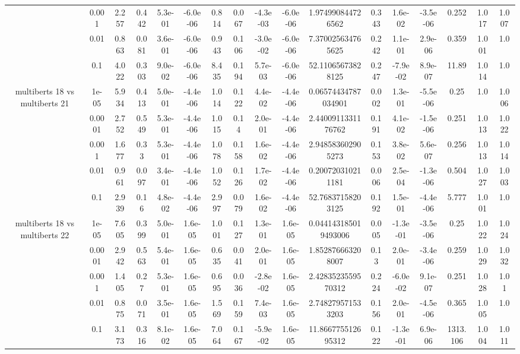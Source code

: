 \begin{tabular}{|c|c|c|c|c|c|c|c|c|c|c|c|c|c|c|c|c|}
 & 0.001 & 2.257 & 0.442 & 5.3e-01 & -6.0e-06 & 0.814 & 0.067 & -4.3e-03 & -6.0e-06 & 1.974990844726562 & 0.343 & 1.6e-02 & -3.5e-06 & 0.252 & 1.017 & 1.007 \\
 & 0.01 & 0.863 & 0.081 & 3.6e-01 & -6.0e-06 & 0.943 & 0.106 & -3.0e-02 & -6.0e-06 & 7.370025634765625 & 0.242 & 1.1e-01 & 2.9e-06 & 0.359 & 1.001 & 1.0 \\
 & 0.1 & 4.022 & 0.303 & 9.0e-02 & -6.0e-06 & 8.435 & 0.194 & 5.7e-03 & -6.0e-06 & 52.11065673828125 & 0.247 & -7.9e-02 & 8.9e-07 & 11.89 & 1.014 & 1.0 \\
\hline
\multirow{5}{*}{multiberts 18 vs multiberts 21} & 1e-05 & 5.934 & 0.413 & 5.0e-01 & -4.4e-06 & 1.014 & 0.122 & 4.4e-02 & -4.4e-06 & 0.06574434787034901 & 0.002 & 1.3e-01 & -5.5e-06 & 0.25 & 1.0 & 1.006 \\
 & 0.0001 & 2.752 & 0.549 & 5.3e-01 & -4.4e-06 & 1.015 & 0.14 & 2.0e-01 & -4.4e-06 & 2.4400911331176762 & 0.191 & 4.1e-02 & -1.5e-06 & 0.251 & 1.013 & 1.022 \\
 & 0.001 & 1.677 & 0.33 & 5.3e-01 & -4.4e-06 & 1.078 & 0.158 & 1.6e-02 & -4.4e-06 & 2.948583602905273 & 0.153 & 3.8e-02 & 5.6e-07 & 0.256 & 1.013 & 1.014 \\
 & 0.01 & 0.961 & 0.097 & 3.4e-01 & -4.4e-06 & 1.052 & 0.126 & 1.7e-02 & -4.4e-06 & 0.200720310211181 & 0.006 & 2.5e-04 & -1.3e-06 & 0.504 & 1.027 & 1.003 \\
 & 0.1 & 2.939 & 0.16 & 4.8e-02 & -4.4e-06 & 2.997 & 0.079 & 1.6e-02 & -4.4e-06 & 52.76837158203125 & 0.192 & 1.5e-01 & -4.4e-06 & 5.777 & 1.001 & 1.0 \\
\hline
\multirow{5}{*}{multiberts 18 vs multiberts 22} & 1e-05 & 7.605 & 0.399 & 5.0e-01 & 1.6e-05 & 1.001 & 0.127 & 1.3e-01 & 1.6e-05 & 0.044143185019493006 & 0.005 & -1.3e-01 & -3.5e-06 & 0.25 & 1.022 & 1.024 \\
 & 0.0001 & 2.942 & 0.563 & 5.4e-01 & 1.6e-05 & 0.635 & 0.041 & 2.0e-01 & 1.6e-05 & 1.852876663208007 & 0.13 & 2.0e-01 & -3.4e-06 & 0.259 & 1.029 & 1.032 \\
 & 0.001 & 1.405 & 0.27 & 5.3e-01 & 1.6e-05 & 0.695 & 0.036 & -2.8e-02 & 1.6e-05 & 2.4283523559570312 & 0.224 & -6.0e-02 & 9.1e-07 & 0.251 & 1.028 & 1.01 \\
 & 0.01 & 0.875 & 0.071 & 3.5e-01 & 1.6e-05 & 1.569 & 0.159 & 7.4e-03 & 1.6e-05 & 2.748279571533203 & 0.156 & 2.0e-01 & -4.5e-06 & 0.365 & 1.005 & 1.0 \\
 & 0.1 & 3.173 & 0.316 & 8.1e-02 & 1.6e-05 & 7.064 & 0.167 & -5.9e-02 & 1.6e-05 & 11.866775512695312 & 0.122 & -1.3e-01 & 6.9e-06 & 1313.106 & 1.004 & 1.011 \\

\end{tabular}
